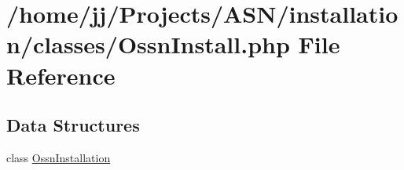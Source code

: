 \hypertarget{_ossn_install_8php}{}\section{/home/jj/\+Projects/\+A\+S\+N/installation/classes/\+Ossn\+Install.php File Reference}
\label{_ossn_install_8php}
\subsection*{Data Structures}
\begin{DoxyCompactItemize}
\item 
class \hyperlink{class_ossn_installation}{Ossn\+Installation}
\end{DoxyCompactItemize}
